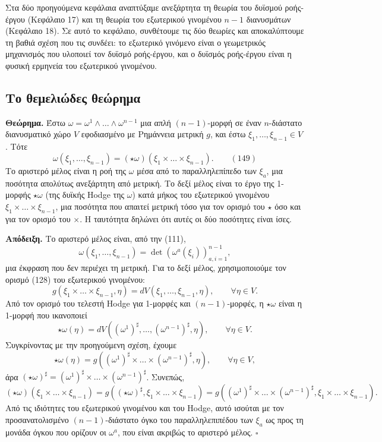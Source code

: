 \documentclass[12pt]{article}
\begin{document}
Στα δύο προηγούμενα κεφάλαια αναπτύξαμε ανεξάρτητα τη θεωρία του δυϊσμού ροής-έργου (Κεφάλαιο 17) και τη θεωρία του εξωτερικού γινομένου $n-1$ διανυσμάτων (Κεφάλαιο 18). Σε αυτό το κεφάλαιο, συνθέτουμε τις δύο θεωρίες και αποκαλύπτουμε τη βαθιά σχέση που τις συνδέει: το εξωτερικό γινόμενο είναι ο γεωμετρικός μηχανισμός που υλοποιεί τον δυϊσμό ροής-έργου, και ο δυϊσμός ροής-έργου είναι η φυσική ερμηνεία του εξωτερικού γινομένου.

\subsection{Το θεμελιώδες θεώρημα}

\textbf{Θεώρημα.} Έστω $\omega = \omega^1 \wedge \dots \wedge \omega^{n-1}$ μια απλή $(n-1)$-μορφή σε έναν $n$-διάστατο διανυσματικό χώρο $V$ εφοδιασμένο με Ρημάννεια μετρική $g$, και έστω $\xi_1, \dots, \xi_{n-1} \in V$. Τότε
\begin{equation}
\omega(\xi_1, \dots, \xi_{n-1}) = (\star \omega)(\xi_1 \times \dots \times \xi_{n-1}). \qquad (149)
\end{equation}
Το αριστερό μέλος είναι η ροή της $\omega$ μέσα από το παραλληλεπίπεδο των $\xi_a$, μια ποσότητα απολύτως ανεξάρτητη από μετρική. Το δεξί μέλος είναι το έργο της 1-μορφής $\star \omega$ (της δυϊκής Hodge της $\omega$) κατά μήκος του εξωτερικού γινομένου $\xi_1 \times \dots \times \xi_{n-1}$, μια ποσότητα που απαιτεί μετρική τόσο για τον ορισμό του $\star$ όσο και για τον ορισμό του $\times$. Η ταυτότητα δηλώνει ότι αυτές οι δύο ποσότητες είναι ίσες.

\textbf{Απόδειξη.} Το αριστερό μέλος είναι, από την (111),
\[
\omega(\xi_1, \dots, \xi_{n-1}) = \det \left( \omega^a(\xi_i) \right)_{a,i=1}^{n-1},
\]
μια έκφραση που δεν περιέχει τη μετρική. Για το δεξί μέλος, χρησιμοποιούμε τον ορισμό (128) του εξωτερικού γινομένου:
\[
g(\xi_1 \times \dots \times \xi_{n-1}, \eta) = dV(\xi_1, \dots, \xi_{n-1}, \eta), \qquad \forall \eta \in V.
\]
Από τον ορισμό του τελεστή Hodge για 1-μορφές και $(n-1)$-μορφές, η $\star \omega$ είναι η 1-μορφή που ικανοποιεί
\[
\star \omega(\eta) = dV((\omega^1)^\sharp, \dots, (\omega^{n-1})^\sharp, \eta), \qquad \forall \eta \in V.
\]
Συγκρίνοντας με την προηγούμενη σχέση, έχουμε
\[
\star \omega(\eta) = g((\omega^1)^\sharp \times \dots \times (\omega^{n-1})^\sharp, \eta), \qquad \forall \eta \in V,
\]
άρα $(\star \omega)^\sharp = (\omega^1)^\sharp \times \dots \times (\omega^{n-1})^\sharp$. Συνεπώς,
\[
(\star \omega)(\xi_1 \times \dots \times \xi_{n-1}) = g((\star \omega)^\sharp, \xi_1 \times \dots \times \xi_{n-1}) = g((\omega^1)^\sharp \times \dots \times (\omega^{n-1})^\sharp, \xi_1 \times \dots \times \xi_{n-1}).
\]
Από τις ιδιότητες του εξωτερικού γινομένου και του Hodge, αυτό ισούται με τον προσανατολισμένο $(n-1)$-διάστατο όγκο του παραλληλεπιπέδου των $\xi_a$ ως προς τη μονάδα όγκου που ορίζουν οι $\omega^a$, που είναι ακριβώς το αριστερό μέλος. $\square$
\end{document}
